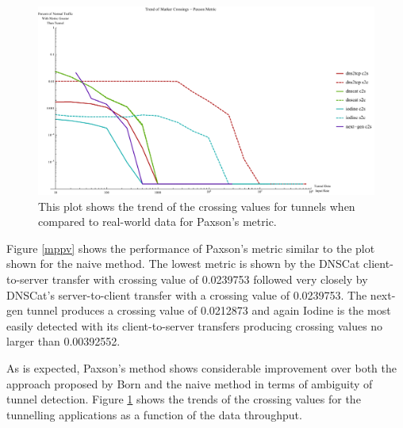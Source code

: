 \documentclass[12pt]{report}
\theoremstyle{remark}
\theoremstyle{definition}
\theoremstyle{definition}
\theoremstyle{definition}
\begin{document}
\begin{figure}
\centering
\includegraphics[width=\textwidth]{figures/cpplot.pdf}
\caption[Trend of Crossing Value for Tunnels - Paxson's Metric]{This plot shows
the trend of the crossing values for tunnels when compared to real-world data for
Paxson's metric.}
\label{cpplot}
\end{figure}

Figure \ref{mppv} shows the performance of Paxson's metric similar to the plot
shown for the naive method. The lowest metric is shown by the DNSCat
client-to-server transfer with crossing value of 0.0239753 followed very closely
by DNSCat's server-to-client transfer with a crossing value of 0.0239753. The
next-gen tunnel produces a crossing value of 0.0212873 and again Iodine is the
most easily detected with its client-to-server transfers producing crossing
values no larger than 0.00392552.

As is expected, Paxson's method shows considerable improvement over both the
approach proposed by Born and the naive method in terms of ambiguity of tunnel
detection. Figure \ref{cpplot} shows the trends of the crossing values for the
tunnelling applications as a function of the data throughput.
\end{document}
